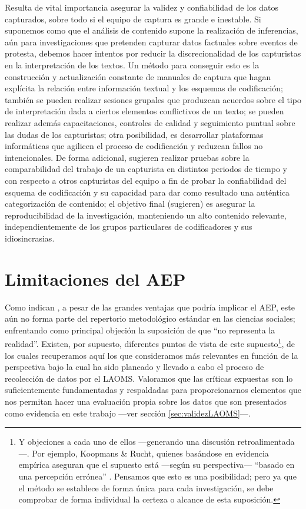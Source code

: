 \documentclass[letterpaper, 11pt]{book}
\theoremstyle{definition}
\theoremstyle{remark}
\begin{document}
Resulta de vital importancia asegurar la validez y confiabilidad de los datos capturados, sobre todo si el equipo de captura es grande e inestable. 
Si suponemos como \citet{1990_Krippendorff_ContentAnalysis} que el análisis de contenido supone la realización de inferencias, aún para investigaciones que pretenden capturar datos factuales sobre eventos de protesta, debemos hacer intentos por reducir la discrecionalidad de los capturistas en la interpretación de los textos. 
Un método para conseguir esto es la construcción y actualización constante de manuales de captura que hagan explícita la relación entre información textual y los esquemas de codificación; también se pueden realizar sesiones grupales que produzcan acuerdos sobre el tipo de interpretación dada a ciertos elementos conflictivos de un texto; se pueden realizar además capacitaciones, controles de calidad y seguimiento puntual sobre las dudas de los capturistas; otra posibilidad, es desarrollar plataformas informáticas que agilicen el proceso de codificación y reduzcan fallos no intencionales. 
De forma adicional, \citet{2015_Lacy_BestContentAnalysis} sugieren realizar pruebas sobre la comparabilidad del trabajo de un capturista en distintos periodos de tiempo y con respecto a otros capturistas del equipo a fin de probar la confiabilidad del esquema de codificación y su capacidad para dar como resultado una auténtica categorización de contenido; el objetivo final (sugieren) es asegurar la reproducibilidad de la investigación, manteniendo un alto contenido relevante, independientemente de los grupos particulares de codificadores y sus idiosincrasias.




\section{Limitaciones del AEP}
\label{sec:limitaciones}

Como indican \citet{2002_Koopmans_AEP}, a pesar de las grandes ventajas que podría implicar el AEP, este aún no forma parte del repertorio metodológico estándar en las ciencias sociales; enfrentando como principal objeción la suposición de que ``no representa la realidad''. 
Existen, por supuesto, diferentes puntos de vista de este supuesto\footnote{Y objeciones a cada uno de ellos ---generando una discusión retroalimentada---. 
Por ejemplo, Koopmans \& Rucht, quienes basándose en evidencia empírica aseguran que el supuesto está ---según su perspectiva--- ``basado en una percepción errónea'' \citep[252]{2002_Koopmans_AEP}. 
Pensamos que esto es una posibilidad; pero ya que el método se establece de forma única para cada investigación, se debe comprobar de forma individual la certeza o alcance de esta suposición.}, de los cuales recuperamos aquí los que consideramos más relevantes en función de la perspectiva bajo la cual ha sido planeado y llevado a cabo el proceso de recolección de datos por el LAOMS. 
Valoramos que las críticas expuestas son lo suficientemente fundamentadas y respaldadas para proporcionarnos elementos que nos permitan hacer una evaluación propia sobre los datos que son presentados como evidencia en este trabajo ---ver sección \ref{sec:validezLAOMS}---.
\end{document}
